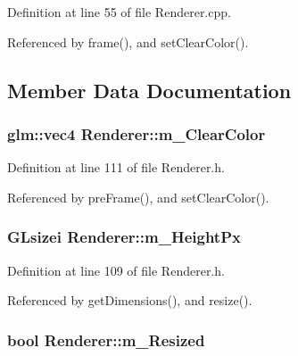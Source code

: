 Definition at line 55 of file Renderer.\+cpp.



Referenced by frame(), and set\+Clear\+Color().



\subsection{Member Data Documentation}
\subsubsection[{\texorpdfstring{m\+\_\+\+Clear\+Color}{m_ClearColor}}]{\setlength{\rightskip}{0pt plus 5cm}glm\+::vec4 Renderer\+::m\+\_\+\+Clear\+Color\hspace{0.3cm}{\ttfamily [private]}}\hypertarget{class_renderer_a9d5ab43b148e3d440e43cf0d7325dec7}{}\label{class_renderer_a9d5ab43b148e3d440e43cf0d7325dec7}


Definition at line 111 of file Renderer.\+h.



Referenced by pre\+Frame(), and set\+Clear\+Color().

\subsubsection[{\texorpdfstring{m\+\_\+\+Height\+Px}{m_HeightPx}}]{\setlength{\rightskip}{0pt plus 5cm}G\+Lsizei Renderer\+::m\+\_\+\+Height\+Px\hspace{0.3cm}{\ttfamily [private]}}\hypertarget{class_renderer_a6a89127b886568aceb1ad94f1c2584e9}{}\label{class_renderer_a6a89127b886568aceb1ad94f1c2584e9}


Definition at line 109 of file Renderer.\+h.



Referenced by get\+Dimensions(), and resize().

\subsubsection[{\texorpdfstring{m\+\_\+\+Resized}{m_Resized}}]{\setlength{\rightskip}{0pt plus 5cm}bool Renderer\+::m\+\_\+\+Resized\hspace{0.3cm}{\ttfamily [private]}}\hypertarget{class_renderer_a7b739cc1443319e00d0c675a27c7e17b}{}\label{class_renderer_a7b739cc1443319e00d0c675a27c7e17b}


